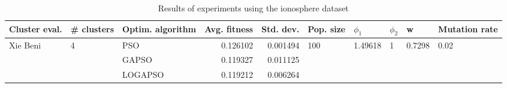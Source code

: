 \begin{table}
\centering
\caption{Results of experiments using the ionosphere dataset}
\begin{tabular}{lllrrlllll}
\toprule
            Cluster eval. &        \# clusters & Optim. algorithm &  Avg. fitness &  Std. dev. &            Pop. size &               $\phi_{1}$ &         $\phi_{2}$ &                       w &         Mutation rate \\
\midrule
\multirow{3}{*}{Xie Beni} & \multirow{3}{*}{4} &              PSO &      0.126102 &   0.001494 & \multirow{3}{*}{100} & \multirow{3}{*}{1.49618} & \multirow{3}{*}{1} & \multirow{3}{*}{0.7298} & \multirow{3}{*}{0.02} \\
                          &                    &            GAPSO &      0.119327 &   0.011125 &                      &                          &                    &                         &                       \\
                          &                    &          LOGAPSO &      0.119212 &   0.006264 &                      &                          &                    &                         &                       \\
\bottomrule
\end{tabular}
\end{table}
